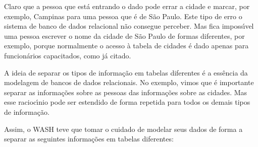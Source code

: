 \documentclass[
12pt,		%
openright,	%
twoside,  %
a4paper,			%
chapter=TITLE,		%
english,			%
french,				%
spanish,			%
brazil				%
]{USPSC-classe/USPSC}
\begin{document}
Claro que a pessoa que est\'a entrando o dado pode errar a cidade e marcar, por exemplo, Campinas para uma pessoa que \'e de S\~ao Paulo. Este tipo de erro o sistema de banco de dados relacional n\~ao consegue perceber. Mas fica imposs\'{\i}vel uma pessoa escrever o nome da cidade de S\~ao Paulo de formas diferentes, por exemplo, porque normalmente o acesso \`a tabela de cidades \'e dado apenas para funcion\'arios capacitados, como j\'a citado.

















A ideia de separar os tipos de informa\c{c}\~ao em tabelas diferentes \'e a ess\^encia da modelagem de bancos de dados relacionais. No exemplo, vimos que \'e importante separar as informa\c{c}\~oes sobre as pessoas das informa\c{c}\~oes sobre as cidades. Mas esse racioc\'{\i}nio pode ser estendido de forma repetida para todos os demais tipos de informa\c{c}\~ao.

















Assim, o WASH teve que tomar o cuidado de modelar seus dados de forma a separar as seguintes informa\c{c}\~oes em tabelas diferentes:
\end{document}
